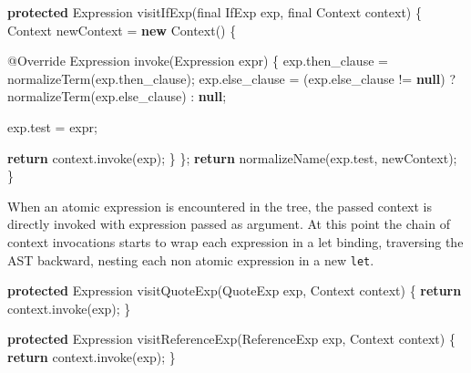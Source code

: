 \documentclass[12pt,a4paper,oneside,openright]{book}
\newenvironment{Shaded}{\begin{snugshade}}{\end{snugshade}}
\newcommand{\KeywordTok}[1]{\textcolor[rgb]{0.13,0.29,0.53}{\textbf{{#1}}}}
\newcommand{\DataTypeTok}[1]{\textcolor[rgb]{0.13,0.29,0.53}{{#1}}}
\newcommand{\FunctionTok}[1]{\textcolor[rgb]{0.00,0.00,0.00}{{#1}}}
\newcommand{\NormalTok}[1]{{#1}}
\begin{document}
\begin{Shaded}
\begin{Highlighting}[]
\KeywordTok{protected} \NormalTok{Expression }\FunctionTok{visitIfExp}\NormalTok{(}\DataTypeTok{final} \NormalTok{IfExp exp,}
                                \DataTypeTok{final} \NormalTok{Context context) \{}
    \NormalTok{Context newContext = }\KeywordTok{new} \NormalTok{Context() \{}

        \FunctionTok{@Override}
        \NormalTok{Expression }\FunctionTok{invoke}\NormalTok{(Expression expr) \{}
            \NormalTok{exp.}\FunctionTok{then_clause} \NormalTok{= }\FunctionTok{normalizeTerm}\NormalTok{(exp.}\FunctionTok{then_clause}\NormalTok{);}
            \NormalTok{exp.}\FunctionTok{else_clause} \NormalTok{= (exp.}\FunctionTok{else_clause} \NormalTok{!= }\KeywordTok{null}\NormalTok{)}
                              \NormalTok{? }\FunctionTok{normalizeTerm}\NormalTok{(exp.}\FunctionTok{else_clause}\NormalTok{)}
                              \NormalTok{: }\KeywordTok{null}\NormalTok{;}

            \NormalTok{exp.}\FunctionTok{test} \NormalTok{= expr;}

            \KeywordTok{return} \NormalTok{context.}\FunctionTok{invoke}\NormalTok{(exp);}
        \NormalTok{\}}
    \NormalTok{\};}
    \KeywordTok{return} \FunctionTok{normalizeName}\NormalTok{(exp.}\FunctionTok{test}\NormalTok{, newContext);}
\NormalTok{\}}
\end{Highlighting}
\end{Shaded}

When an atomic expression is encountered in the tree, the passed context
is directly invoked with expression passed as argument. At this point
the chain of context invocations starts to wrap each expression in a let
binding, traversing the AST backward, nesting each non atomic expression
in a new \texttt{let}.

\begin{Shaded}
\begin{Highlighting}[]
\KeywordTok{protected} \NormalTok{Expression }\FunctionTok{visitQuoteExp}\NormalTok{(QuoteExp exp,}
                                   \NormalTok{Context context) \{}
    \KeywordTok{return} \NormalTok{context.}\FunctionTok{invoke}\NormalTok{(exp);}
\NormalTok{\}}

\KeywordTok{protected} \NormalTok{Expression }\FunctionTok{visitReferenceExp}\NormalTok{(ReferenceExp exp,}
                                       \NormalTok{Context context) \{}
    \KeywordTok{return} \NormalTok{context.}\FunctionTok{invoke}\NormalTok{(exp);}
\NormalTok{\}}
\end{Highlighting}
\end{Shaded}
\end{document}
